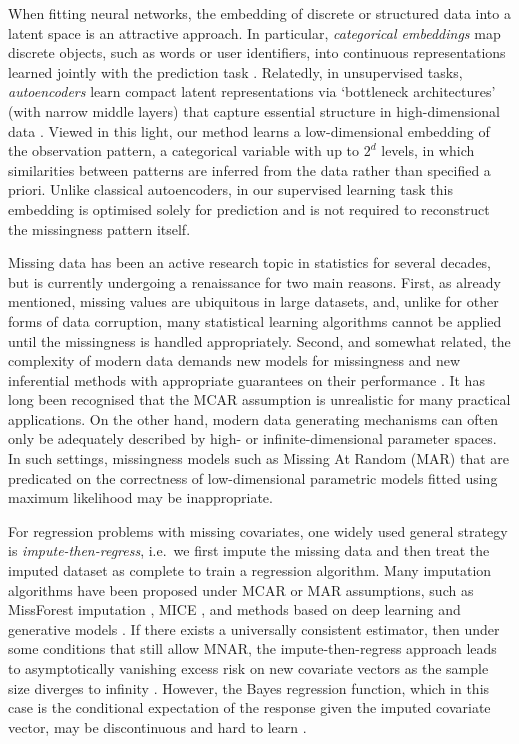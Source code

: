 \documentclass[12pt]{article}
\begin{document}
When fitting neural networks, the embedding of discrete or structured data into a latent space is an attractive approach.  In particular, \emph{categorical embeddings} map discrete objects, such as words or user identifiers, into continuous representations learned jointly with the prediction task \citep{mikolov2013efficient,guo2016entity}.  Relatedly, in unsupervised tasks, \emph{autoencoders} learn compact latent representations via `bottleneck architectures' (with narrow middle layers) that capture essential structure in high-dimensional data \citep{hinton2006reducing,vincent2008extracting}. Viewed in this light, our method learns a low-dimensional embedding of the observation pattern, a categorical variable with up to $2^d$ levels, in which similarities between patterns are inferred from the data rather than specified a priori. Unlike classical autoencoders, in our supervised learning task this embedding is optimised solely for prediction and is not required to reconstruct the missingness pattern itself.

Missing data has been an active research topic in statistics for several decades, but is currently undergoing a renaissance for two main reasons.  First, as already mentioned, missing values are ubiquitous in large datasets, and, unlike for other forms of data corruption, many statistical learning algorithms cannot be applied until the missingness is handled appropriately.  Second, and somewhat related, the complexity of modern data demands new models for missingness and new inferential methods with appropriate guarantees on their performance \citep{berrett2023optimal,ma2024estimation}.  It has long been recognised that the MCAR assumption is unrealistic for many practical applications.  On the other hand, modern data generating mechanisms can often only be adequately described by high- or infinite-dimensional parameter spaces.  In such settings, missingness models such as Missing At Random (MAR) that are predicated on the correctness of low-dimensional parametric models fitted using maximum likelihood may be inappropriate.  

For regression problems with missing covariates, one widely used general strategy is \emph{impute-then-regress}, i.e.~we first impute the missing data and then treat the imputed dataset as complete to train a regression algorithm. Many imputation algorithms have been proposed under MCAR or MAR assumptions, such as MissForest imputation \citep{stekhoven2012missforest}, MICE \citep{van2011mice}, and methods based on deep learning and generative models \citep{li2019misgan,mattei2019miwae,nazabal2020handling,zhang2025diffputer}.  If there exists a universally consistent estimator, then under some conditions that still allow MNAR, the impute-then-regress approach leads to asymptotically vanishing excess risk on new covariate vectors as the sample size diverges to infinity \citep{le2021what,josse2024consistency}. 
However, the Bayes regression function, which in this case is the conditional expectation of the response given the imputed covariate vector, may be discontinuous and hard to learn \citep{le2021what}.  
\end{document}
